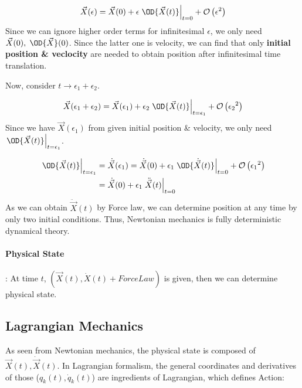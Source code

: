 \documentclass[final]{IEEEphot}
\newcommand{\At}[2]{\left.#1\right|_{#2}} %
\newcommand{\HOT}[1]{\mathcal{O}\left( #1 \right)} %
\newcommand{\eps}{\epsilon}
\newcommand{\X}{\vec{X}}
\newcommand{\BKS}[1]{\left( #1 \right)} %
\newcommand{\HS}{\hspace{0.3cm}} %
\newcommand{\VS}{\vspace{0.3cm}} %
\newcommand{\Com}{,\hspace{0.1cm}} %
\begin{document}
\begin{equation}
 \vec{X}(\epsilon) = \vec{X}(0) + \epsilon \At{\OD{\vec{X}(t)}}{t=0}+ \HOT{\eps^2}
\end{equation}
Since we can ignore higher order terms for infinitesimal $\eps$, we only need $\vec{X}(0)\Com \OD{\vec{X}}(0)$. Since the latter one is velocity, we can find that only \textbf{initial position \& veclocity} 
are needed to obtain position after infinitesimal time translation.

Now, consider $ t \rightarrow \eps_1 + \eps_2$.

\begin{equation}
 \vec{X}(\eps_1 + \eps_2) = \vec{X}(\eps_1) + \eps_2 \At{\OD{\vec{X}(t)}}{t=\eps_1}+\HOT{{\eps_2} ^2}
\end{equation}
Since we have $\vec{X}(\eps_1)$ from given initial position \& velocity, we only need $\At{\OD{\vec{X}(t)}}{t=\eps_1}$.

\begin{equation}
\begin{split}
 \At{\OD{\vec{X}(t)}}{t=\eps_1} & = \dot{\vec{X}}(\eps_1) = \dot{\vec{X}}(0) + \eps_1 \At{\OD{\dot{\vec{X}}(t)}}{t=0} + \HOT{{\eps_1}^2} \\
                                   & = \dot{\vec{X}}(0) + \eps_1 \At{\ddot{\vec{X}}(t)}{t=0}
\end{split}
\end{equation}
As we can obtain $\ddot{\vec{X}}(t)$ by Force law, we can determine position at any time by only two initial conditions. Thus, Newtonian mechanics is fully deterministic dynamical theory.
\VS

\paragraph{Physical State}

: At time $t$, $\BKS{\X(t), \dot{X}(t) + Force Law}$ is given, then we can determine physical state.

\VS
\VS

\subsection{Lagrangian Mechanics}


\HS As seen from Newtonian mechanics, the physical state is composed of $\X(t),\dot{\X}(t)$. In Lagrangian formalism, the general coordinates and derivatives of those ($q_k(t), \dot{q}_k(t)$) \footnotemark[1] are ingredients of Lagrangian, which defines Action\footnotemark[2]:
\end{document}
